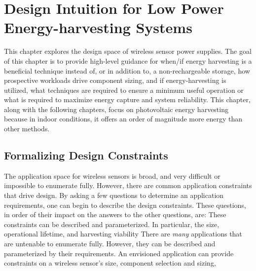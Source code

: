 \chapter{Design Intuition for Low Power Energy-harvesting Systems}
\label{chap:intuition}

This chapter explores the design space of wireless sensor power supplies. 
The goal of this chapter is to provide high-level guidance for when/if energy harvesting is a beneficial technique instead of, or in addition to, a non-rechargeable storage, how prospective workloads drive component sizing, and if energy-harvesting is utilized, what techniques are required to ensure a minimum useful operation or what is required to maximize energy capture and system reliability. 
This chapter, along with the following chapters, focus on photovoltaic energy harvesting because in indoor conditions, it offers an order of magnitude more energy than other methods.

\section{Formalizing Design Constraints}

The application space for wireless sensors is broad, and very difficult or impossible to enumerate fully. However, there are common application constraints that drive design. By asking a few questions to determine an application requirements, one can begin to describe the design constraints. These questions, in order of their impact on the answers to the other questions, are:
These constraints can be described and parameterized.
In particular, the size, operational lifetime, and harvesting viability 
There are \textit{many} applications that are untenable to enumerate fully. However, they can be described and parameterized by their requirements. An envisioned application can provide constraints on a wireless sensor's size, component selection and sizing, 


